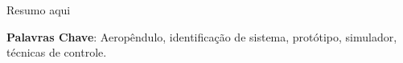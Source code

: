
\begin{resumo}
	
Resumo aqui

\textbf{Palavras Chave}: Aeropêndulo, identificação de sistema, protótipo, simulador, técnicas de controle.

\end{resumo}

